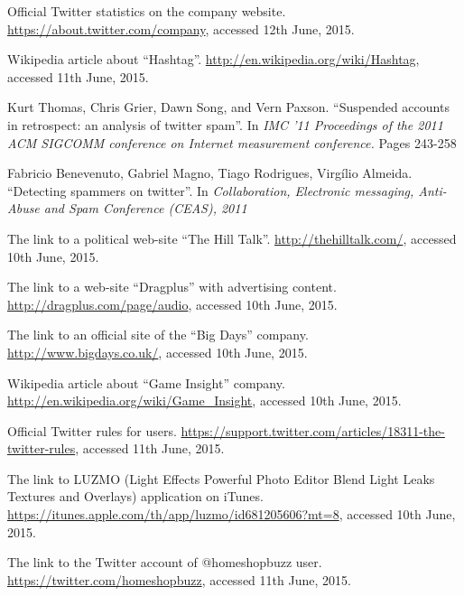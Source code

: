 \documentclass[journal, a4paper, 12pt]{article}
\begin{document}
\begin{thebibliography}{10}

    Official Twitter statistics on the company website.
    \url{https://about.twitter.com/company}, accessed 12th June, 2015.
    
    Wikipedia article about ``Hashtag''.
    \url{http://en.wikipedia.org/wiki/Hashtag}, accessed 11th June, 2015.
	
    Kurt Thomas, Chris Grier, Dawn Song, and Vern Paxson. ``Suspended accounts in 	 retrospect: an analysis of twitter spam''. In \textit{IMC '11 Proceedings of the 2011 ACM SIGCOMM conference on Internet measurement conference.} Pages 243-258 
    
    Fabricio Benevenuto, Gabriel Magno, Tiago Rodrigues, Virgílio Almeida. ``Detecting spammers on twitter''. In \textit{Collaboration, Electronic messaging, Anti-Abuse and Spam Conference (CEAS), 2011}

    The link to a political web-site ``The Hill Talk''.
    \url{http://thehilltalk.com/}, accessed 10th June, 2015.

    The link to a web-site ``Dragplus'' with advertising content.
	\url{http://dragplus.com/page/audio}, accessed 10th June, 2015.

    The link to an official site of the ``Big Days'' company.
	\url{http://www.bigdays.co.uk/}, accessed 10th June, 2015.

	Wikipedia article about ``Game Insight'' company.
    \url{http://en.wikipedia.org/wiki/Game_Insight}, accessed 10th June, 2015.
    
    Official Twitter rules for users.
    \url{https://support.twitter.com/articles/18311-the-twitter-rules}, accessed 11th June, 2015.
    
	The link to LUZMO (Light Effects Powerful Photo Editor Blend Light Leaks Textures and Overlays) application on iTunes.
    \url{https://itunes.apple.com/th/app/luzmo/id681205606?mt=8}, accessed 10th June, 2015.
    
    The link to the Twitter account of @homeshopbuzz user.
    \url{https://twitter.com/homeshopbuzz}, accessed 11th June, 2015.

\end{thebibliography}

\end{document}
